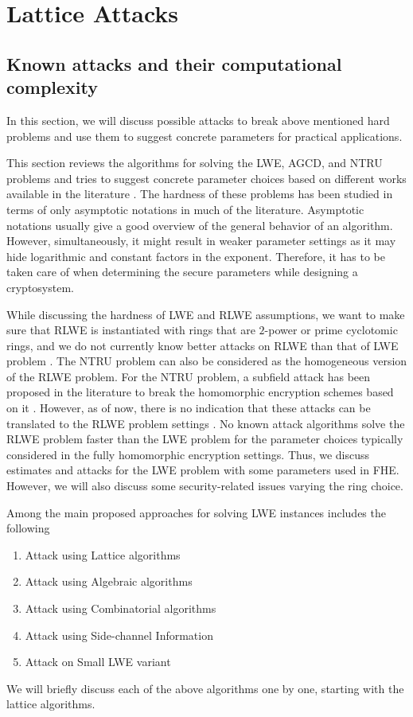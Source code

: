 
\chapter{Lattice Attacks}
\setcounter{section}{0}


\section{Known attacks and their computational complexity}
In this section, we will discuss possible attacks to break above mentioned hard problems and use them to suggest concrete parameters for practical applications.

This section reviews the algorithms for solving the LWE, AGCD, and NTRU problems and tries to suggest concrete parameter choices based on different works available in the literature \cite{}. The hardness of these problems has been studied in terms of only asymptotic notations in much of the literature. Asymptotic notations usually give a good overview of the general behavior of an algorithm. However, simultaneously, it might result in weaker parameter settings as it may hide logarithmic and constant factors in the exponent. Therefore, it has to be taken care of when determining the secure parameters while designing a cryptosystem.

While discussing the hardness of LWE and RLWE assumptions, we want to make sure that RLWE is instantiated with rings that are $2$-power or prime cyclotomic rings, and we do not currently know better attacks on RLWE than that of LWE problem \cite{}. The NTRU problem can also be considered as the homogeneous version of the RLWE problem. For the NTRU problem, a subfield attack has been proposed in the literature to break the homomorphic encryption schemes based on it \cite{albrecht2016subfield}. However, as of now, there is no indication that these attacks can be translated to the RLWE problem settings \cite{albrecht2017dual}. No known attack algorithms solve the RLWE problem faster than the LWE problem for the parameter choices typically considered in the fully homomorphic encryption settings. Thus, we discuss estimates and attacks for the LWE problem with some parameters used in FHE. However, we will also discuss some security-related issues varying the ring choice.

Among the main proposed approaches for solving LWE instances includes the following
\begin{enumerate}
    \item Attack using Lattice algorithms
    \item Attack using Algebraic algorithms
    \item Attack using Combinatorial algorithms
    \item Attack using Side-channel Information
    \item Attack on Small LWE variant


\end{enumerate}
We will briefly discuss each of the above algorithms one by one, starting with the lattice algorithms.




